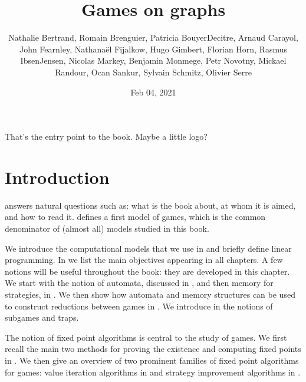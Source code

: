 \documentclass[letterpaper,10pt,english]{sphinxmanual}
\title{Games on graphs}
\date{Feb 04, 2021}
\author{Nathalie Bertrand, Romain Brenguier, Patricia Bouyer\sphinxhyphen{}Decitre, Arnaud Carayol, John Fearnley, Nathanaël Fijalkow, Hugo Gimbert, Florian Horn, Rasmus Ibsen\sphinxhyphen{}Jensen, Nicolas Markey, Benjamin Monmege, Petr Novotny, Mickael Randour, Ocan Sankur, Sylvain Schmitz, Olivier Serre}
\let\sphinxpxdimen\pdfpxdimen\else\newdimen\sphinxpxdimen
\begin{document}
\pagestyle{empty}
\sphinxmaketitle
\pagestyle{plain}
\sphinxtableofcontents
\pagestyle{normal}
\label{\detokenize{book::doc}}


That’s the entry point to the book. Maybe a little logo?

\noindent{\hspace*{\fill}\sphinxincludegraphics[width=400\sphinxpxdimen]{{cover}.jpg}\hspace*{\fill}}


\chapter{Introduction}
\label{\detokenize{1_Introduction/main:introduction}}\label{\detokenize{1_Introduction/main:chap-introduction}}\label{\detokenize{1_Introduction/main::doc}}
 answers natural questions such as: what is the book about, at whom it is aimed, and how to read it.
{\hyperref[\detokenize{1_Introduction/simple:sec-simple}]{}} defines a first model of games, which is the common denominator of (almost all) models studied in this book.

We introduce the computational models that we use in  and briefly define linear programming.
In  we list the main objectives appearing in all chapters.
A few notions will be useful throughout the book: they are developed in this chapter.
We start with the notion of automata, discussed in , and then memory for strategies, in .
We then show how automata and memory structures can be used to construct reductions between games in .
We introduce in  the notions of subgames and traps.

The notion of fixed point algorithms is central to the study of games.
We first recall the main two methods for proving the existence and computing fixed points in .
We then give an overview of two prominent families of fixed point algorithms for games:
value iteration algorithms in  and strategy improvement algorithms in .
\end{document}
